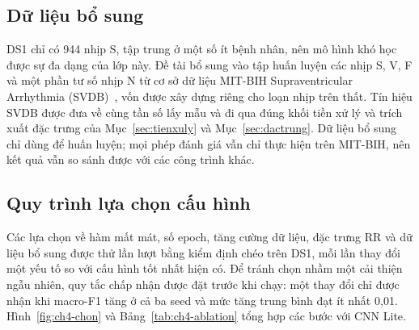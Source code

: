 \subsection{Dữ liệu bổ sung}

DS1 chỉ có 944 nhịp S, tập trung ở một số ít bệnh nhân, nên mô hình khó học được sự đa dạng của lớp này.
Đề tài bổ sung vào tập huấn luyện các nhịp S, V, F và một phần tư số nhịp N từ cơ sở dữ liệu MIT-BIH Supraventricular Arrhythmia (SVDB)~\cite{greenwald1990improved}, vốn được xây dựng riêng cho loạn nhịp trên thất.
Tín hiệu SVDB được đưa về cùng tần số lấy mẫu và đi qua đúng khối tiền xử lý và trích xuất đặc trưng của Mục~\ref{sec:tienxuly} và Mục~\ref{sec:dactrung}.
Dữ liệu bổ sung chỉ dùng để huấn luyện; mọi phép đánh giá vẫn chỉ thực hiện trên MIT-BIH, nên kết quả vẫn so sánh được với các công trình khác.

\subsection{Quy trình lựa chọn cấu hình}

Các lựa chọn về hàm mất mát, số epoch, tăng cường dữ liệu, đặc trưng RR và dữ liệu bổ sung được thử lần lượt bằng kiểm định chéo trên DS1, mỗi lần thay đổi một yếu tố so với cấu hình tốt nhất hiện có.
Để tránh chọn nhầm một cải thiện ngẫu nhiên, quy tắc chấp nhận được đặt trước khi chạy: một thay đổi chỉ được nhận khi macro-F1 tăng ở cả ba seed và mức tăng trung bình đạt ít nhất 0{,}01.
Hình~\ref{fig:ch4-chon} và Bảng~\ref{tab:ch4-ablation} tổng hợp các bước với CNN Lite.

